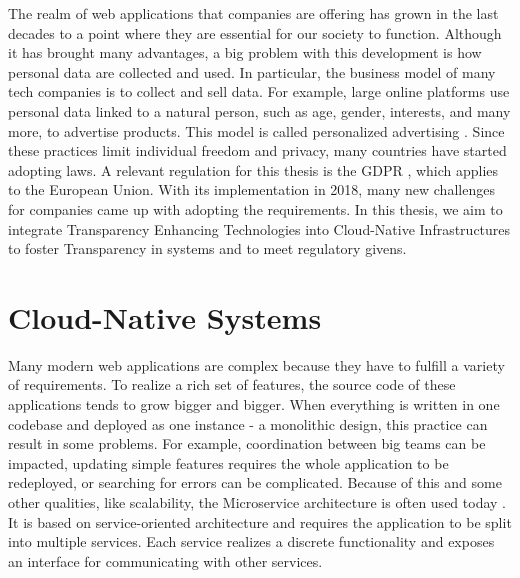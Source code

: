 


\graphicspath{{1_introduction/figures/}}

The realm of web applications that companies are offering has grown in the last decades to a point where they are essential for our society to function. Although it has brought many advantages, a big problem with this development is how personal data are collected and used. In particular, the business model of many tech companies is to collect and sell data.
For example, large online platforms use personal data linked to a natural person, such as age, gender, interests, and many more, to advertise products. This model is called personalized advertising \cite{tucker_social_2014}. Since these practices limit individual freedom and privacy, many countries have started adopting laws. A relevant regulation for this thesis is the GDPR \cite{noauthor_general_2016}, which applies to the European Union. With its implementation in 2018, many new challenges for companies came up with adopting the requirements.
In this thesis, we aim to integrate Transparency Enhancing Technologies into Cloud-Native Infrastructures to foster Transparency in systems and to meet regulatory givens.

\section{Cloud-Native Systems}
Many modern web applications are complex because they have to fulfill a variety of requirements. 
To realize a rich set of features, the source code of these applications tends to grow bigger and bigger. When everything is written in one codebase and deployed as one instance - a monolithic design, this practice can result in some problems. For example, coordination between big teams can be impacted, updating simple features requires the whole application to be redeployed, or searching for errors can be complicated. Because of this and some other qualities, like scalability, the Microservice architecture is often used today \cite{alshuqayran_systematic_2016}. It is based on service-oriented architecture and requires the application to be split into multiple services. Each service realizes a discrete functionality and exposes an interface for communicating with other services. 



